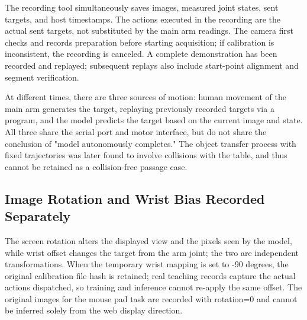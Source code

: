 The recording tool simultaneously saves images, measured joint states, sent targets, and host timestamps. The actions executed in the recording are the actual sent targets, not substituted by the main arm readings. The camera first checks and records preparation before starting acquisition; if calibration is inconsistent, the recording is canceled. A complete demonstration has been recorded and replayed; subsequent replays also include start-point alignment and segment verification.

At different times, there are three sources of motion: human movement of the main arm generates the target, replaying previously recorded targets via a program, and the model predicts the target based on the current image and state. All three share the serial port and motor interface, but do not share the conclusion of "model autonomously completes." The object transfer process with fixed trajectories was later found to involve collisions with the table, and thus cannot be retained as a collision-free passage case.

\subsection{Image Rotation and Wrist Bias Recorded Separately}\label{s01-detail-3}

The screen rotation alters the displayed view and the pixels seen by the model, while wrist offset changes the target from the arm joint; the two are independent transformations. When the temporary wrist mapping is set to -90 degrees, the original calibration file hash is retained; real teaching records capture the actual actions dispatched, so training and inference cannot re-apply the same offset. The original images for the mouse pad task are recorded with rotation=0 and cannot be inferred solely from the web display direction.

